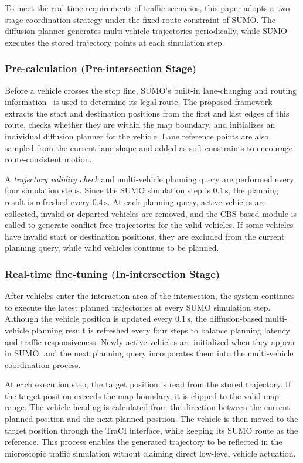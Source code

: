 \documentclass[journal]{IEEEtran}
\begin{document}
To meet the real-time requirements of traffic scenarios, this paper adopts a two-stage coordination strategy under the fixed-route constraint of SUMO. The diffusion planner generates multi-vehicle trajectories periodically, while SUMO executes the stored trajectory points at each simulation step.

\subsubsection{Pre-calculation (Pre-intersection Stage)}

Before a vehicle crosses the stop line, SUMO's built-in lane-changing and routing information~\cite{erdmann2015} is used to determine its legal route. The proposed framework extracts the start and destination positions from the first and last edges of this route, checks whether they are within the map boundary, and initializes an individual diffusion planner for the vehicle. Lane reference points are also sampled from the current lane shape and added as soft constraints to encourage route-consistent motion.

A \textit{trajectory validity check} and multi-vehicle planning query are performed every four simulation steps. Since the SUMO simulation step is $0.1\,\text{s}$, the planning result is refreshed every $0.4\,\text{s}$. At each planning query, active vehicles are collected, invalid or departed vehicles are removed, and the CBS-based module is called to generate conflict-free trajectories for the valid vehicles. If some vehicles have invalid start or destination positions, they are excluded from the current planning query, while valid vehicles continue to be planned.

\subsubsection{Real-time fine-tuning (In-intersection Stage)}

After vehicles enter the interaction area of the intersection, the system continues to execute the latest planned trajectories at every SUMO simulation step. Although the vehicle position is updated every $0.1\,\text{s}$, the diffusion-based multi-vehicle planning result is refreshed every four steps to balance planning latency and traffic responsiveness. Newly active vehicles are initialized when they appear in SUMO, and the next planning query incorporates them into the multi-vehicle coordination process.

At each execution step, the target position is read from the stored trajectory. If the target position exceeds the map boundary, it is clipped to the valid map range. The vehicle heading is calculated from the direction between the current planned position and the next planned position. The vehicle is then moved to the target position through the TraCI interface, while keeping its SUMO route as the reference. This process enables the generated trajectory to be reflected in the microscopic traffic simulation without claiming direct low-level vehicle actuation.
\end{document}
